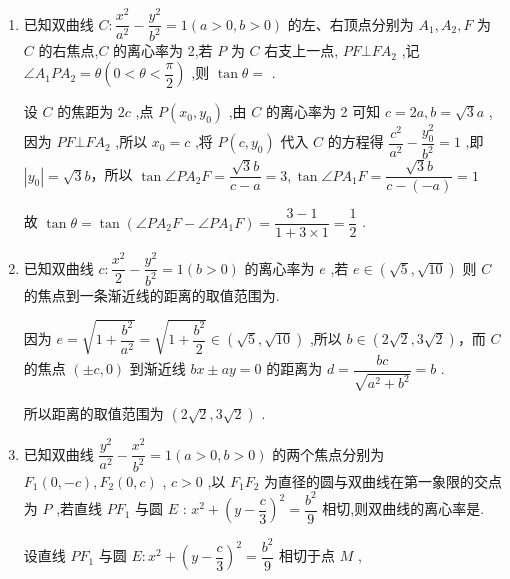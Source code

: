\begin{enumerate}
\begin{jieda}
        实轴长 4$\Longleftrightarrow a = 2$，将$\left( {4,\sqrt{3}}\right)$代入方程，可得$b = 1$，因此$c = \sqrt{5}$，故目标式为$\dfrac{4}{5}$
    \end{jieda}

    \item 已知双曲线 $C : \dfrac{{x}^{2}}{{a}^{2}} - \dfrac{{y}^{2}}{{b}^{2}} = 1\left( {a > 0,b > 0}\right)$ 的左、右顶点分别为 ${A}_{1},{A}_{2},F$ 为 $C$ 的右焦点,$C$ 的离心率为 2,若 $P$ 为 $C$ 右支上一点, ${PF} \bot  F{A}_{2}$ ,记 $\angle {A}_{1}P{A}_{2} = \theta \left( {0 < \theta  < \dfrac{\pi }{2}}\right)$ ,则 $\tan \theta  =$ .
    \begin{jieda}
        设 $C$ 的焦距为 ${2c}$ ,点 $P\left( {{x}_{0},{y}_{0}}\right)$ ,由 $C$ 的离心率为 2 可知 $c = {2a},b = \sqrt{3}a$ ,因为 ${PF}\bot {F{A}_{2}}$ ,所以 ${x}_{0} = c$ ,将 $P\left( {c,{y}_{0}}\right)$ 代入 $C$ 的方程得 $\dfrac{{c}^{2}}{{a}^{2}} - \dfrac{{y}_{0}^{2}}{{b}^{2}} = 1$ ,即 $\left| {y}_{0}\right|  = \sqrt{3}b$，所以 $\tan \angle P{A}_{2}F = \dfrac{\sqrt{3}b}{c - a} = 3,\tan \angle P{A}_{1}F = \dfrac{\sqrt{3}b}{c - \left( {-a}\right) } = 1$
        
        故 $\tan \theta  = \tan \left( {\angle P{A}_{2}F - \angle P{A}_{1}F}\right)  = \dfrac{3 - 1}{1 + 3 \times  1} = \dfrac{1}{2}$ .
    \end{jieda} 

    \item 已知双曲线 $c : \dfrac{{x}^{2}}{2} - \dfrac{{y}^{2}}{{b}^{2}} = 1\left( {b > 0}\right)$ 的离心率为 $e$ ,若 $e \in  \left( {\sqrt{5},\sqrt{10}}\right)$ 则 $C$ 的焦点到一条渐近线的距离的取值范围为.
    \begin{jieda}
        因为 $e = \sqrt{1 + \dfrac{{b}^{2}}{{a}^{2}}} = \sqrt{1 + \dfrac{{b}^{2}}{2}} \in  \left( {\sqrt{5},\sqrt{10}}\right)$ ,所以 $b \in  \left( {2\sqrt{2},3\sqrt{2}}\right)$，而 $C$ 的焦点 $\left( {\pm c,0}\right)$ 到渐近线 ${bx} \pm  {ay} = 0$ 的距离为 $d = \dfrac{bc}{\sqrt{{a}^{2} + {b}^{2}}} = b$ .
        
        所以距离的取值范围为 $\left( {2\sqrt{2},3\sqrt{2}}\right)$ .
    \end{jieda}

    \item 已知双曲线 $\dfrac{{y}^{2}}{{a}^{2}} - \dfrac{{x}^{2}}{{b}^{2}} = 1\left( {a > 0,b > 0}\right)$ 的两个焦点分别为 ${F}_{1}\left( {0, - c}\right) ,{F}_{2}\left( {0,c}\right)$ , $c > 0$ ,以 ${F}_{1}{F}_{2}$ 为直径的圆与双曲线在第一象限的交点为 $P$ ,若直线 $P{F}_{1}$ 与圆 $E$ : ${x}^{2} + {\left( y - \dfrac{c}{3}\right) }^{2} = \dfrac{{b}^{2}}{9}$ 相切,则双曲线的离心率是.
    \begin{jieda}
        设直线 $P{F}_{1}$ 与圆 $E : {x}^{2} + {\left( y - \dfrac{c}{3}\right) }^{2} = \dfrac{{b}^{2}}{9}$ 相切于点 $M$ ,
        

\end{jieda}
\end{enumerate}
